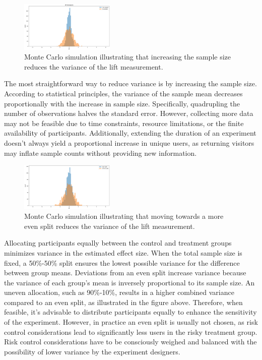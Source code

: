 \documentclass[final,5p,times,twocolumn,authoryear]{elsarticle}
\begin{document}
\begin{figure}[h]
	\centering 
	\includegraphics[width=0.4\textwidth]{fig-1.png}	
	\caption{Monte Carlo simulation illustrating that increasing the sample size reduces the variance of the lift measurement.} 
\end{figure}

The most straightforward way to reduce variance is by increasing the sample size. According to statistical principles, the variance of the sample mean decreases proportionally with the increase in sample size. Specifically, quadrupling the number of observations halves the standard error. However, collecting more data may not be feasible due to time constraints, resource limitations, or the finite availability of participants. Additionally, extending the duration of an experiment doesn't always yield a proportional increase in unique users, as returning visitors may inflate sample counts without providing new information.

\begin{figure}[h]
	\centering 
	\includegraphics[width=0.4\textwidth]{fig-2.png}	
	\caption{Monte Carlo simulation illustrating that moving towards a more even split reduces the variance of the lift measurement.} 
\end{figure}

Allocating participants equally between the control and treatment groups minimizes variance in the estimated effect size. When the total sample size is fixed, a 50\%-50\% split ensures the lowest possible variance for the difference between group means. Deviations from an even split increase variance because the variance of each group's mean is inversely proportional to its sample size. An uneven allocation, such as 90\%-10\%, results in a higher combined variance compared to an even split, as illustrated in the figure above. Therefore, when feasible, it's advisable to distribute participants equally to enhance the sensitivity of the experiment. However, in practice an even split is usually not chosen, as risk control considerations lead to significantly less users in the risky treatment group. Risk control considerations have to be consciously weighed and balanced with the possibility of lower variance by the experiment designers.
\end{document}
